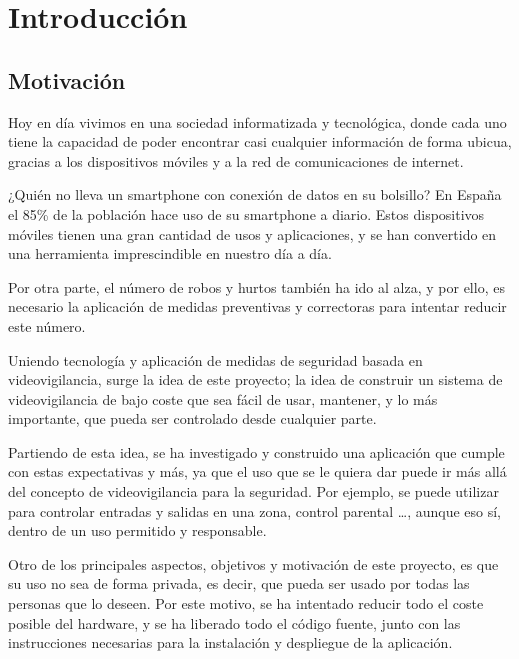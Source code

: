 
\pagestyle{miEstilo1}

\section{Introducción}

\subsection{Motivación}

Hoy en día vivimos en una sociedad informatizada y tecnológica, donde cada uno tiene la capacidad de poder encontrar casi cualquier información de forma ubicua, gracias a los dispositivos móviles y a la red de comunicaciones de internet.

¿Quién no lleva un smartphone con conexión de datos en su bolsillo? En España el 85\% de la población hace uso de su smartphone a diario. Estos dispositivos móviles tienen una gran cantidad de usos y aplicaciones, y se han convertido en una herramienta imprescindible en nuestro día a día.


Por otra parte, el número de robos y hurtos también ha ido al alza, y por ello, es necesario la aplicación de medidas preventivas y correctoras para intentar reducir este número.

Uniendo tecnología y aplicación de medidas de seguridad basada en videovigilancia, surge la idea de este proyecto; la idea de construir un sistema de videovigilancia de bajo coste que sea fácil de usar, mantener, y lo más importante, que pueda ser controlado desde cualquier parte.

Partiendo de esta idea, se ha investigado y construido una aplicación que cumple con estas expectativas y más, ya que el uso que se le quiera dar puede ir más allá del concepto de videovigilancia para la seguridad. Por ejemplo, se puede utilizar para controlar entradas y salidas en una zona, control parental \ldots, aunque eso sí, dentro de un uso permitido y responsable.

Otro de los principales aspectos, objetivos y motivación de este proyecto, es que su uso no sea de forma privada, es decir, que pueda ser usado por todas las personas que lo deseen. Por este motivo, se ha intentado reducir todo el coste posible del hardware, y se ha liberado todo el código fuente, junto con las instrucciones necesarias para la instalación y despliegue de la aplicación.

